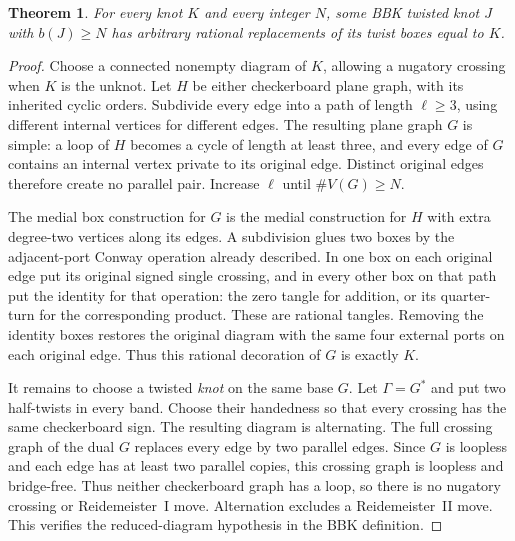 \documentclass[11pt]{article}
\newtheorem{theorem}{Theorem}
\begin{document}
\begin{theorem}\label{thm:universalorigin}
For every knot $K$ and every integer $N$, some BBK twisted knot $J$
with $b(J)\ge N$ has arbitrary rational replacements of its twist
boxes equal to $K$.
\end{theorem}
\begin{proof}
Choose a connected nonempty diagram of $K$, allowing a nugatory
crossing when $K$ is the unknot. Let $H$ be either checkerboard plane
graph, with its inherited cyclic orders. Subdivide every edge into a
path of length $\ell\ge3$, using different internal vertices for
different edges. The resulting plane graph $G$ is simple: a loop of
$H$ becomes a cycle of length at least three, and every edge of $G$
contains an internal vertex private to its original edge. Distinct
original edges therefore create no parallel pair. Increase $\ell$
until $\#V(G)\ge N$.

The medial box construction for $G$ is the medial construction for $H$
with extra degree-two vertices along its edges. A subdivision glues
two boxes by the adjacent-port Conway operation already described.
In one box on each original edge put its original signed single
crossing, and in every other box on that path put the identity for
that operation: the zero tangle for addition, or its quarter-turn
for the corresponding product. These are rational tangles. Removing
the identity boxes restores the original diagram with the same
four external ports on each original edge. Thus this rational
decoration of $G$ is exactly $K$.

It remains to choose a twisted \emph{knot} on the same base $G$.
Let $\Gamma=G^*$ and put two half-twists in every band.
Choose their handedness so that every crossing has the same
checkerboard sign. The resulting diagram is alternating.
The full crossing graph of the dual $G$ replaces every edge by
two parallel edges. Since $G$ is loopless and each edge has at least
two parallel copies, this crossing graph is loopless and bridge-free.
Thus neither checkerboard graph has a loop, so there is no nugatory
crossing or Reidemeister~I move. Alternation excludes a
Reidemeister~II move. This verifies the reduced-diagram hypothesis
in the BBK definition.


\end{proof}
\end{document}

